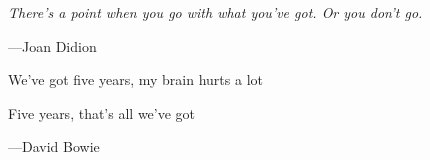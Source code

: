 \documentclass{book}
\begin{document}

\pagestyle{empty}


\cleardoublepage




\newpage
\thispagestyle{empty} %

\setlength\epigraphrule{0pt}
\setlength{}

\null
\vspace{20ex}


\epigraph{\itshape
  There’s a point when you go with what you’ve got. Or you don’t go.
}{
  ---Joan Didion
}

\cleardoublepage

\pagestyle{fancy}

\setcounter{page}{1} %
\setcounter{tocdepth}{1}

{\hypersetup{hidelinks}\tableofcontents}


\newpage


%
%
%
%

\epigraph{\itshape

  We've got five years, my brain hurts a lot

  Five years, that's all we've got
}{
  ---David Bowie
}

\end{document}
